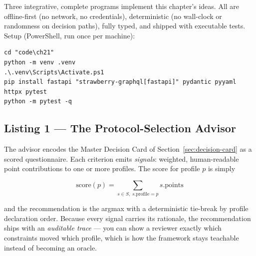 Three integrative, complete programs implement this chapter's ideas. All are
offline-first (no network, no credentials), deterministic (no wall-clock or
randomness on decision paths), fully typed, and shipped with executable
tests. Setup (PowerShell, run once per machine):

\begin{verbatim}
cd "code\ch21"
python -m venv .venv
.\.venv\Scripts\Activate.ps1
pip install fastapi "strawberry-graphql[fastapi]" pydantic pyyaml httpx pytest
python -m pytest -q
\end{verbatim}

\subsection{Listing 1 --- The Protocol-Selection Advisor}
\label{sec:code-advisor}

The advisor encodes the Master Decision Card of
Section~\ref{sec:decision-card} as a scored questionnaire. Each criterion
emits \emph{signals}: weighted, human-readable point contributions to one or
more profiles. The score for profile $p$ is simply

\begin{equation}
\mathrm{score}(p) = \sum_{s \in S,\; s.\mathrm{profile} = p} s.\mathrm{points}
\end{equation}

and the recommendation is the argmax with a deterministic tie-break by
profile declaration order. Because every signal carries its rationale, the
recommendation ships with an \emph{auditable trace} --- you can show a
reviewer exactly which constraints moved which profile, which is how the
framework stays teachable instead of becoming an oracle.

